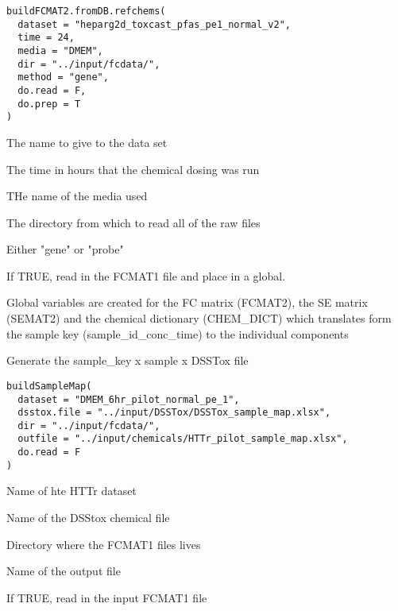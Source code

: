 \documentclass[letterpaper]{book}
\begin{document}
%
\begin{Usage}
\begin{verbatim}
buildFCMAT2.fromDB.refchems(
  dataset = "heparg2d_toxcast_pfas_pe1_normal_v2",
  time = 24,
  media = "DMEM",
  dir = "../input/fcdata/",
  method = "gene",
  do.read = F,
  do.prep = T
)
\end{verbatim}
\end{Usage}
%
\begin{Arguments}
\begin{ldescription}
\item[\code{dataset}] The name to give to the data set

\item[\code{time}] The time in hours that the chemical dosing was run

\item[\code{media}] THe name of the media used

\item[\code{dir}] The directory from which to read all of the raw files

\item[\code{method}] Either "gene" or "probe"

\item[\code{do.read}] If TRUE, read in the FCMAT1 file and place in a global.
\end{ldescription}
\end{Arguments}
%
\begin{Value}
Global variables are created for the FC matrix (FCMAT2), the SE matrix (SEMAT2)
and the chemical dictionary (CHEM\_DICT) which translates form the sample key
(sample\_id\_conc\_time) to the individual components
\end{Value}
%
\begin{Description}\relax
Generate the sample\_key x sample x DSSTox file
\end{Description}
%
\begin{Usage}
\begin{verbatim}
buildSampleMap(
  dataset = "DMEM_6hr_pilot_normal_pe_1",
  dsstox.file = "../input/DSSTox/DSSTox_sample_map.xlsx",
  dir = "../input/fcdata/",
  outfile = "../input/chemicals/HTTr_pilot_sample_map.xlsx",
  do.read = F
)
\end{verbatim}
\end{Usage}
%
\begin{Arguments}
\begin{ldescription}
\item[\code{dataset}] Name of hte HTTr dataset

\item[\code{dsstox.file}] Name of the DSStox chemical file

\item[\code{dir}] Directory where the FCMAT1 files lives

\item[\code{outfile}] Name of the output file

\item[\code{do.read}] If TRUE, read in the input FCMAT1 file
\end{ldescription}
\end{Arguments}
\end{document}
